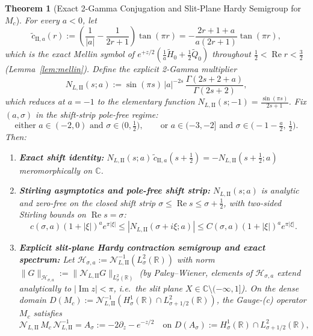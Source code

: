 \documentclass[11pt,a4paper]{article}
\newtheorem{thm}{Theorem}
\begin{document}
\begin{thm}[Exact 2-Gamma Conjugation and Slit-Plane Hardy Semigroup for $M_c$]\label{thm:conjugation}
For every $a < 0$, let
\[
\tilde c_{\mathrm{II},a}(r) := \left(\frac{1}{|a|} - \frac{1}{2r+1}\right)\tan(\pi r) = -\frac{2r + 1 + a}{a(2r+1)}\tan(\pi r),
\]
which is the exact Mellin symbol of $e^{+z/2}(\frac{1}{a}\widetilde{H}_0 + \frac{1}{2}\widetilde{Q}_0)$ throughout $\frac{1}{2} < \operatorname{Re} r < \frac{3}{2}$ (Lemma~\ref{lem:mellin}). Define the explicit 2-Gamma multiplier
\begin{equation}\label{eq:NL_II}
N_{L,\mathrm{II}}(s; a) := \sin(\pi s)\,|a|^{-2s}\,\frac{\Gamma(2s + 2 + a)}{\Gamma(2s + 2)},
\end{equation}
which reduces at $a = -1$ to the elementary function $N_{L,\mathrm{II}}(s;-1) = \frac{\sin(\pi s)}{2s+1}$. Fix $(a, \sigma)$ in the shift-strip pole-free regime:
\[
\text{either } a \in (-2, 0) \text{ and } \sigma \in \big(0, \tfrac{1}{2}\big), \qquad \text{or } a \in (-3, -2] \text{ and } \sigma \in \big(-1 - \tfrac{a}{2},\, \tfrac{1}{2}\big).
\]
Then:
\begin{enumerate}
  \item \textbf{Exact shift identity:} $N_{L,\mathrm{II}}(s;a)\,\tilde c_{\mathrm{II},a}(s+\frac{1}{2}) = -N_{L,\mathrm{II}}(s+\frac{1}{2};a)$ meromorphically on $\mathbb{C}$.
  \item \textbf{Stirling asymptotics and pole-free shift strip:} $N_{L,\mathrm{II}}(s;a)$ is analytic and zero-free on the closed shift strip $\sigma \le \operatorname{Re} s \le \sigma + \frac{1}{2}$, with two-sided Stirling bounds on $\operatorname{Re} s = \sigma$:
  \[
  c(\sigma,a)(1+|\xi|)^a e^{\pi|\xi|} \le |N_{L,\mathrm{II}}(\sigma+i\xi;a)| \le C(\sigma,a)(1+|\xi|)^a e^{\pi|\xi|}.
  \]
  \item \textbf{Explicit slit-plane Hardy contraction semigroup and exact spectrum:} Let $\mathcal{H}_{\sigma,a} := \mathcal{N}_{L,\mathrm{II}}^{-1}(L^2_\sigma(\mathbb{R}))$ with norm $\|G\|_{\mathcal{H}_{\sigma,a}} := \|\mathcal{N}_{L,\mathrm{II}} G\|_{L^2_\sigma(\mathbb{R})}$ (by Paley--Wiener, elements of $\mathcal{H}_{\sigma,a}$ extend analytically to $|\operatorname{Im} z| < \pi$, i.e.\ the slit plane $X \in \mathbb{C}\setminus(-\infty,1]$). On the dense domain $D(M_c) := \mathcal{N}_{L,\mathrm{II}}^{-1}(H^1_\sigma(\mathbb{R}) \cap L^2_{\sigma+1/2}(\mathbb{R}))$, the Gauge-(c) operator $M_c$ satisfies
  \[
  \mathcal{N}_{L,\mathrm{II}}\,M_c\,\mathcal{N}_{L,\mathrm{II}}^{-1} = A_\sigma := -2\partial_z - e^{-z/2} \quad \text{on } D(A_\sigma) := H^1_\sigma(\mathbb{R}) \cap L^2_{\sigma+1/2}(\mathbb{R}),
\]
\end{enumerate}
\end{thm}
\end{document}
